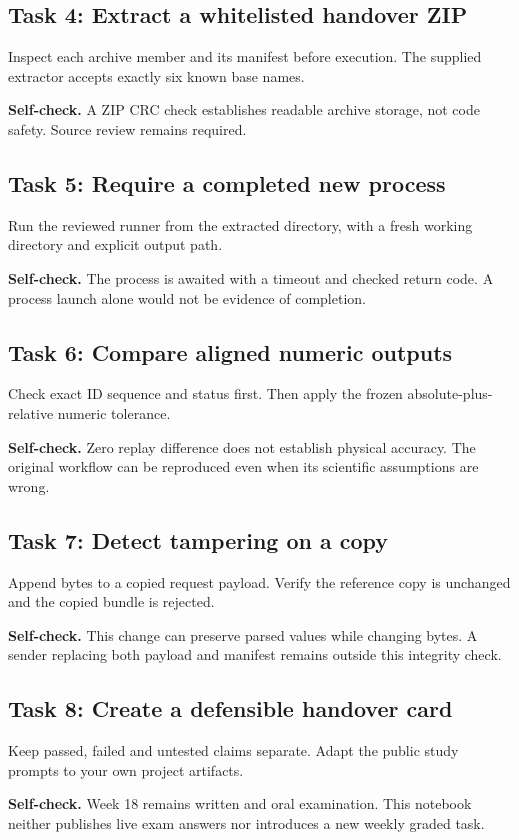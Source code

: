 \subsection{Task 4: Extract a whitelisted handover ZIP}
Inspect each archive member and its manifest before execution. The supplied extractor accepts exactly six known base names.

\textbf{Self-check.} A ZIP CRC check establishes readable archive storage, not code safety. Source review remains required.
\subsection{Task 5: Require a completed new process}
Run the reviewed runner from the extracted directory, with a fresh working directory and explicit output path.

\textbf{Self-check.} The process is awaited with a timeout and checked return code. A process launch alone would not be evidence of completion.
\subsection{Task 6: Compare aligned numeric outputs}
Check exact ID sequence and status first. Then apply the frozen absolute-plus-relative numeric tolerance.

\textbf{Self-check.} Zero replay difference does not establish physical accuracy. The original workflow can be reproduced even when its scientific assumptions are wrong.
\subsection{Task 7: Detect tampering on a copy}
Append bytes to a copied request payload. Verify the reference copy is unchanged and the copied bundle is rejected.

\textbf{Self-check.} This change can preserve parsed values while changing bytes. A sender replacing both payload and manifest remains outside this integrity check.
\subsection{Task 8: Create a defensible handover card}
Keep passed, failed and untested claims separate. Adapt the public study prompts to your own project artifacts.

\textbf{Self-check.} Week 18 remains written and oral examination. This notebook neither publishes live exam answers nor introduces a new weekly graded task.
